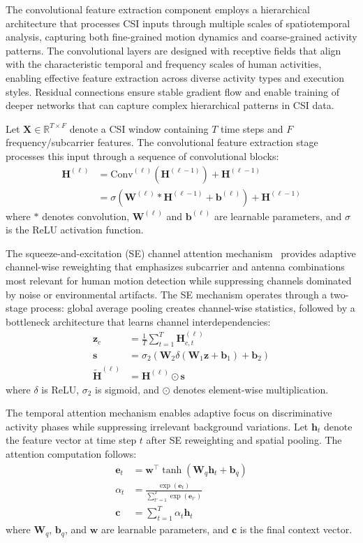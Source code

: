 \documentclass[journal]{IEEEtran}
\begin{document}
The convolutional feature extraction component employs a hierarchical architecture that processes CSI inputs through multiple scales of spatiotemporal analysis, capturing both fine-grained motion dynamics and coarse-grained activity patterns. The convolutional layers are designed with receptive fields that align with the characteristic temporal and frequency scales of human activities, enabling effective feature extraction across diverse activity types and execution styles. Residual connections ensure stable gradient flow and enable training of deeper networks that can capture complex hierarchical patterns in CSI data.

Let $\mathbf{X} \in \mathbb{R}^{T \times F}$ denote a CSI window containing $T$ time steps and $F$ frequency/subcarrier features. The convolutional feature extraction stage processes this input through a sequence of convolutional blocks:
\begin{align}
\mathbf{H}^{(\ell)} &= \mathrm{Conv}^{(\ell)}(\mathbf{H}^{(\ell-1)}) + \mathbf{H}^{(\ell-1)} \\
&= \sigma(\mathbf{W}^{(\ell)} * \mathbf{H}^{(\ell-1)} + \mathbf{b}^{(\ell)}) + \mathbf{H}^{(\ell-1)}
\end{align}
where $*$ denotes convolution, $\mathbf{W}^{(\ell)}$ and $\mathbf{b}^{(\ell)}$ are learnable parameters, and $\sigma$ is the ReLU activation function.

The squeeze-and-excitation (SE) channel attention mechanism~\cite{se_networks2018} provides adaptive channel-wise reweighting that emphasizes subcarrier and antenna combinations most relevant for human motion detection while suppressing channels dominated by noise or environmental artifacts. The SE mechanism operates through a two-stage process: global average pooling creates channel-wise statistics, followed by a bottleneck architecture that learns channel interdependencies:
\begin{align}
\mathbf{z}_c &= \frac{1}{T} \sum_{t=1}^{T} \mathbf{H}^{(\ell)}_{c,t} \\
\mathbf{s} &= \sigma_2(\mathbf{W}_2 \delta(\mathbf{W}_1 \mathbf{z} + \mathbf{b}_1) + \mathbf{b}_2) \\
\tilde{\mathbf{H}}^{(\ell)} &= \mathbf{H}^{(\ell)} \odot \mathbf{s}
\end{align}
where $\delta$ is ReLU, $\sigma_2$ is sigmoid, and $\odot$ denotes element-wise multiplication.

The temporal attention mechanism enables adaptive focus on discriminative activity phases while suppressing irrelevant background variations. Let $\mathbf{h}_t$ denote the feature vector at time step $t$ after SE reweighting and spatial pooling. The attention computation follows:
\begin{align}
\mathbf{e}_t &= \mathbf{w}^\top \tanh(\mathbf{W}_q \mathbf{h}_t + \mathbf{b}_q) \\
\alpha_t &= \frac{\exp(\mathbf{e}_t)}{\sum_{t'=1}^{T} \exp(\mathbf{e}_{t'})} \\
\mathbf{c} &= \sum_{t=1}^{T} \alpha_t \mathbf{h}_t
\end{align}
where $\mathbf{W}_q$, $\mathbf{b}_q$, and $\mathbf{w}$ are learnable parameters, and $\mathbf{c}$ is the final context vector.
\end{document}
